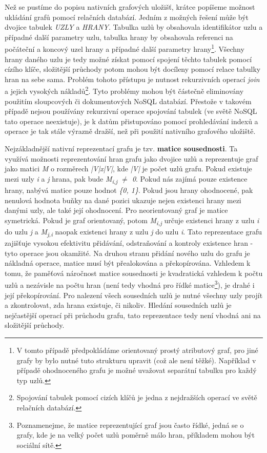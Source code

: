 Než se pustíme do popisu nativních grafových uložišť, krátce popíšeme možnost ukládání grafů pomocí relačních databází. Jedním z možných řešení může být dvojice tabulek \textit{UZLY} a \textit{HRANY}. Tabulka uzlů by obsahovala identifikátor uzlu a případné další parametry uzlu, tabulka hrany by obsahovala referenci na počáteční a koncový uzel hrany a případné další parametry hrany\footnote{V tomto případě předpokládáme orientovaný prostý atributový graf, pro jiné grafy by bylo nutné tuto strukturu upravit (což ale není těžké). Například v případě ohodnoceného grafu je možné uvažovat separátní tabulku pro každý typ uzlů.}. Všechny hrany daného uzlu je tedy možné získat pomocí spojení těchto tabulek pomocí cízího klíče, složitější průchody potom mohou být docíleny pomocí relace tabulky hran na sebe sama. Problém tohoto přístupu je nutnost rekurzivních operací \textit{join} a jejich vysokých nákladů\footnote{Spojování tabulek pomocí cizích klíčů je jedna z nejdražších operací ve světě relačních databází.}. Tyto problémy mohou být částečně eliminovány použitím sloupcových či dokumentových NoSQL databází. Přestože v takovém případě nejsou používány rekurzivní operace spojování tabulek (ve světě NoSQL tato operace neexistuje), je k datům přistupováno pomocí prohledávání indexů a operace je tak stále výrazně dražší, než při použití nativního grafového uložiště.\cite{Lal15}

Nejzákladnější nativní reprezentací grafu je tzv. \textbf{matice sousednosti}. Ta využívá možnosti reprezentování hran grafu jako dvojice uzlů a reprezentuje graf jako matici \textit{M} o rozměrech \textit{|V|x|V|}, kde \textit{|V|} je počet uzlů grafu. Pokud existuje mezi uzly \textit{i} a \textit{j} hrana, pak bude \textit{M\textsubscript{i,j} $\neq$ 0}.
Pokud nás zajímá pouze existence hrany, nabývá matice pouze hodnot \textit{\{0, 1\}}. Pokud jsou hrany ohodnocené, pak nenulová hodnota buňky na dané pozici ukazuje nejen existenci hrany mezi danými uzly, ale také její ohodnocení. Pro neorientovaný graf je matice symetrická. Pokud je graf orientovaný, potom \textit{M\textsubscript{i,j}} určuje existenci hrany z uzlu \textit{i} do uzlu \textit{j} a \textit{M\textsubscript{j,i}} naopak existenci hrany z uzlu \textit{j} do uzlu \textit{i}.
Tato reprezentace grafu zajišťuje vysokou efektivitu přidávání, odstraňování a kontroly existence hran - tyto operace jsou okamžité.  Na druhou stranu přidání nového uzlu do grafu je nákladná operace, matice musí být přealokována a překopírována. Vzhledem k tomu, že paměťová náročnost matice sousednosti je kvadratická vzhledem k počtu uzlů a nezávisle na počtu hran (není tedy vhodná pro řídké matice\footnote{Poznamenejme, že matice reprezentující graf jsou často řídké, jedná se o grafy, kde je na velký počet uzlů poměrně málo hran, příkladem mohou být sociální sítě.}), je drahé i její překopírování.
Pro nalezení všech sousedních uzlů je nutné všechny uzly projít a zkontrolovat, zda hrana existuje, či nikoliv. Hledání sousedních uzlů je nejčastější operací při průchodu grafu, tato reprezentace tedy není vhodná ani na složitější průchody.

